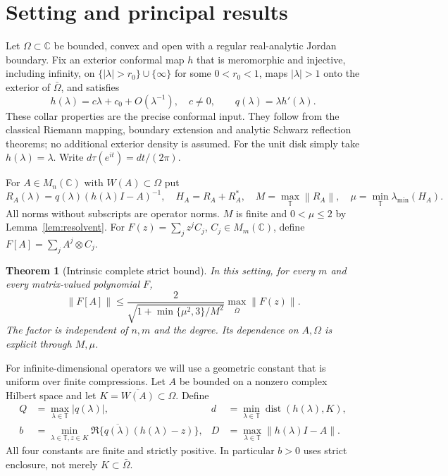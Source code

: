 \documentclass[11pt]{article}
\newtheorem{theorem}{Theorem}[section]
\theoremstyle{remark}\newtheorem{remark}[theorem]{Remark}
\newcommand{\dist}{\operatorname{dist}}
\newcommand{\T}{\mathbb T}
\newcommand{\C}{\mathbb C}
\newcommand{\norm}[1]{\left\lVert #1\right\rVert}
\begin{document}
\section{Setting and principal results}
Let $\Omega\subset\C$ be bounded, convex and open with a regular real-analytic Jordan boundary. Fix an exterior conformal map $h$ that is meromorphic and injective, including infinity, on $\{|\lambda|>r_0\}\cup\{\infty\}$ for some $0<r_0<1$, maps $|\lambda|>1$ onto the exterior of $\bar\Omega$, and satisfies
\[h(\lambda)=c\lambda+c_0+O(\lambda^{-1}),\quad c\ne0,\qquad q(\lambda)=\lambda h'(\lambda).\]
These collar properties are the precise conformal input. They follow from the classical Riemann mapping, boundary extension and analytic Schwarz reflection theorems; no additional exterior density is assumed. For the unit disk simply take $h(\lambda)=\lambda$. Write $d\tau(e^{it})=dt/(2\pi)$.

For $A\in M_n(\C)$ with $W(A)\subset\Omega$ put
\[R_A(\lambda)=q(\lambda)(h(\lambda)I-A)^{-1},\quad H_A=R_A+R_A^*,\quad
M=\max_{\T}\norm{R_A},\quad \mu=\min_{\T}\lambda_{\min}(H_A).
\]
All norms without subscripts are operator norms. $M$ is finite and $0<\mu\le2$ by Lemma~\ref{lem:resolvent}. For $F(z)=\sum_j z^j C_j$, $C_j\in M_m(\C)$, define $F[A]=\sum_j A^j\otimes C_j$.

\begin{theorem}[Intrinsic complete strict bound]\label{thm:intrinsic}
In this setting, for every $m$ and every matrix-valued polynomial $F$,
\begin{equation}\label{eq:intrinsic}
\norm{F[A]}\le \frac{2}{\sqrt{1+\min\{\mu^2,3\}/M^2}}\max_{\bar\Omega}\norm{F(z)}.
\end{equation}
The factor is independent of $n,m$ and the degree. Its dependence on $A,\Omega$ is explicit through $M,\mu$.
\end{theorem}

For infinite-dimensional operators we will use a geometric constant that is uniform over finite compressions. Let $A$ be bounded on a nonzero complex Hilbert space and let $K=\overline{W(A)}\subset\Omega$. Define
\begin{align*}
Q&=\max_{\lambda\in\T}|q(\lambda)|,&d&=\min_{\lambda\in\T}\dist(h(\lambda),K),\\
b&=\min_{\lambda\in\T,z\in K}\Re\{\overline{q(\lambda)}(h(\lambda)-z)\},&
D&=\max_{\lambda\in\T}\norm{h(\lambda)I-A}.
\end{align*}
All four constants are finite and strictly positive. In particular $b>0$ uses strict enclosure, not merely $K\subset\bar\Omega$.
\end{document}
